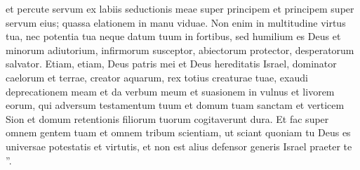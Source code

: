 \begin{biblechapter}
\begin{biblechapter}
\begin{biblechapter}
\begin{biblechapter}
\begin{biblechapter}
\begin{biblechapter}
\begin{biblechapter}
\begin{biblechapter}
\begin{biblechapter}
\verse et percute servum ex labiis seductionis meae super principem et principem super servum eius; quassa elationem in manu viduae. 
\verse Non enim in multitudine virtus tua, nec potentia tua neque datum tuum in fortibus, sed humilium es Deus et minorum adiutorium, infirmorum susceptor, abiectorum protector, desperatorum salvator.
 \verse Etiam, etiam, Deus patris mei et Deus hereditatis Israel, dominator caelorum et terrae, creator aquarum, rex totius creaturae tuae, exaudi deprecationem meam 
\verse et da verbum meum et suasionem in vulnus et livorem eorum, qui adversum testamentum tuum et domum tuam sanctam et verticem Sion et domum retentionis filiorum tuorum cogitaverunt dura. 
\verse Et fac super omnem gentem tuam et omnem tribum scientiam, ut sciant quoniam tu Deus es universae potestatis et virtutis, et non est alius defensor generis Israel praeter te ”.
 

\end{biblechapter}
\end{biblechapter}
\end{biblechapter}
\end{biblechapter}
\end{biblechapter}
\end{biblechapter}
\end{biblechapter}
\end{biblechapter}
\end{biblechapter}
